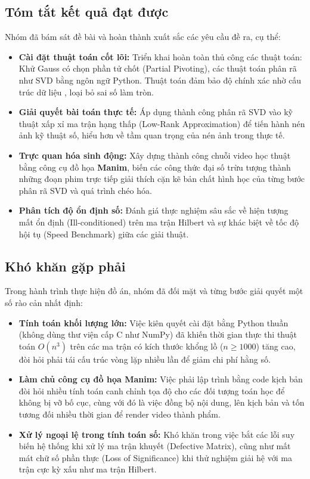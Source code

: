 \documentclass[a4paper]{article}
\begin{document}
\subsection{Tóm tắt kết quả đạt được}
Nhóm đã bám sát đề bài và hoàn thành xuất sắc các yêu cầu đề ra, cụ thể:
\begin{itemize}
    \item \textbf{Cài đặt thuật toán cốt lõi:} Triển khai hoàn toàn thủ công các thuật toán: Khử Gauss có chọn phần tử chốt (Partial Pivoting), các thuật toán phân rã như SVD bằng ngôn ngữ Python. Thuật toán đảm bảo độ chính xác nhờ cấu trúc dữ liệu , loại bỏ sai số làm tròn.
    \item \textbf{Giải quyết bài toán thực tế:} Áp dụng thành công phân rã SVD vào kỹ thuật xấp xỉ ma trận hạng thấp (Low-Rank Approximation) để tiến hành nén ảnh kỹ thuật số, hiểu hơn về tầm quan trọng của nén ảnh trong thực tế.
    \item \textbf{Trực quan hóa sinh động:} Xây dựng thành công chuỗi video học thuật bằng công cụ đồ họa \textbf{Manim}, biến các công thức đại số trừu tượng thành những đoạn phim trực tiếp giải thích cặn kẽ bản chất hình học của từng bước phân rã SVD và quá trình chéo hóa.
    \item \textbf{Phân tích độ ổn định số:} Đánh giá thực nghiệm sâu sắc về hiện tượng mất ổn định (Ill-conditioned) trên ma trận Hilbert và sự khác biệt về tốc độ hội tụ (Speed Benchmark) giữa các giải thuật.
\end{itemize}

\subsection{Khó khăn gặp phải}
Trong hành trình thực hiện đồ án, nhóm đã đối mặt và từng bước giải quyết một số rào cản nhất định:
\begin{itemize}
    \item \textbf{Tính toán khối lượng lớn:} Việc kiên quyết cài đặt bằng Python thuần (không dùng thư viện cấp C như NumPy) đã khiến thời gian thực thi thuật toán $O(n^3)$ trên các ma trận có kích thước khổng lồ ($n \ge 1000$) tăng cao, đòi hỏi phải tái cấu trúc vòng lặp nhiều lần để giảm chi phí hằng số.
    \item \textbf{Làm chủ công cụ đồ họa Manim:} Việc phải lập trình bằng code kịch bản đòi hỏi nhiều tính toán canh chỉnh tọa độ cho các đối tượng toán học để không bị vỡ bố cục, cùng với đó là việc đồng bộ nội dung, lên kịch bản và tốn tương đối nhiều thời gian để render video thành phẩm.
    \item \textbf{Xử lý ngoại lệ trong tính toán số:} Khó khăn trong việc bắt các lỗi suy biến hệ thống khi xử lý ma trận khuyết (Defective Matrix), cũng như mất mát chữ số phần thực (Loss of Significance) khi thử nghiệm giải hệ với ma trận cực kỳ xấu như ma trận Hilbert.
\end{itemize}
\end{document}
